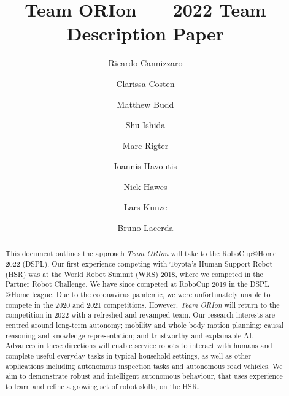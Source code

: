 \documentclass[runningheads,a4paper]{llncs}
\newcommand{\teamori}{Team ORIon}
\begin{document}

\title{\teamori\ --- 2022 Team Description Paper}

\author{Ricardo Cannizzaro \and Clarissa Costen \and Matthew Budd \and Shu Ishida \and Marc Rigter \and Ioannis Havoutis \and Nick Hawes \and Lars Kunze \and Bruno Lacerda}

\maketitle


\begin{abstract}
This document outlines the approach \textit{\teamori} will take to the RoboCup@Home 2022 (DSPL).
Our first experience competing with Toyota's Human Support Robot (HSR) was at the World Robot Summit (WRS) 2018, where we competed in the Partner Robot Challenge. We have since competed at RoboCup 2019 in the DSPL @Home league. Due to the coronavirus pandemic, we were unfortunately unable to compete in the 2020 and 2021 competitions. However, \textit{\teamori} will return to the competition in 2022 with a refreshed and revamped team.
Our research interests are centred around long-term autonomy; mobility and whole body motion planning; causal reasoning and knowledge representation; and trustworthy and explainable AI.
Advances in these directions will enable service robots to interact with humans and complete useful everyday tasks in typical household settings, as well as other applications including autonomous inspection tasks and autonomous road vehicles. 
We aim to demonstrate robust and intelligent autonomous behaviour, that uses experience to learn and refine a growing set of robot skills, on the HSR.
\end{abstract}


\end{document}
